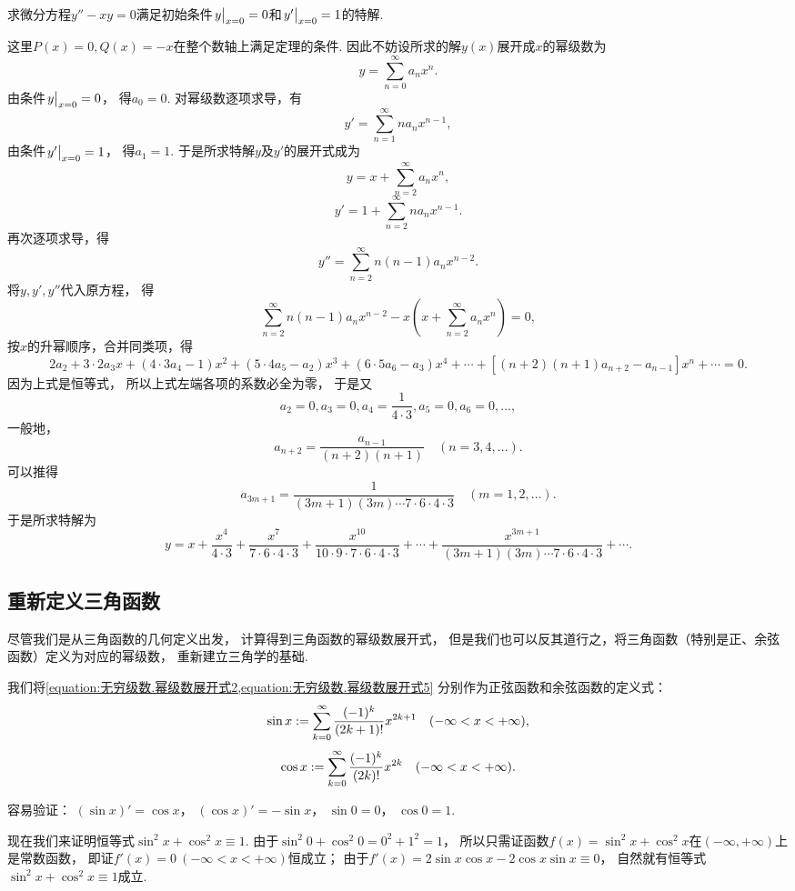 \begin{example}
求微分方程\(y''-xy=0\)满足初始条件\(\eval{y}_{x=0}=0\)和\(\eval{y'}_{x=0}=1\)的特解.
\begin{solution}
这里\(P(x)=0, Q(x)=-x\)在整个数轴上满足定理的条件.
因此不妨设所求的解\(y(x)\)展开成\(x\)的幂级数为\[
	y = \sum_{n=0}^\infty a_n x^n.
\]
由条件\(\eval{y}_{x=0}=0\)，
得\(a_0=0\).
对幂级数逐项求导，有\[
	y' = \sum_{n=1}^\infty n a_n x^{n-1},
\]
由条件\(\eval{y'}_{x=0}=1\)，
得\(a_1=1\).
于是所求特解\(y\)及\(y'\)的展开式成为\[
	y = x + \sum_{n=2}^\infty a_n x^n,
\]\[
	y' = 1 + \sum_{n=2}^\infty n a_n x^{n-1}.
\]
再次逐项求导，得\[
	y'' = \sum_{n=2}^\infty n(n-1) a_n x^{n-2}.
\]
将\(y,y',y''\)代入原方程，
得\[
	\sum_{n=2}^\infty n(n-1) a_n x^{n-2}
	- x \left( x + \sum_{n=2}^\infty a_n x^n \right)
	= 0,
\]
按\(x\)的升幂顺序，合并同类项，得\[
	2 a_2 + 3\cdot2 a_3 x + (4\cdot3 a_4 - 1) x^2
	+ (5\cdot4 a_5 - a_2) x^3 + (6\cdot5 a_6 - a_3) x^4
	+ \dotsb + [(n+2)(n+1) a_{n+2} - a_{n-1}] x^n + \dotsb
	= 0.
\]
因为上式是恒等式，
所以上式左端各项的系数必全为零，
于是又\[
	a_2 = 0,
	a_3 = 0,
	a_4 = \frac{1}{4\cdot3},
	a_5 = 0,
	a_6 = 0,
	\dotsc,
\]
一般地，\[
	a_{n+2} = \frac{a_{n-1}}{(n+2)(n+1)}
	\quad(n=3,4,\dotsc).
\]
可以推得\[
	a_{3m+1} = \frac{1}{(3m+1)(3m) \dotsm 7\cdot6\cdot4\cdot3}
	\quad(m=1,2,\dotsc).
\]
于是所求特解为\[
	y = x + \frac{x^4}{4\cdot3} + \frac{x^7}{7\cdot6\cdot4\cdot3}
	+ \frac{x^{10}}{10\cdot9\cdot7\cdot6\cdot4\cdot3}
	+ \dotsb
	+ \frac{x^{3m+1}}{(3m+1)(3m) \dotsm 7\cdot6\cdot4\cdot3}
	+ \dotsb.
\]
\end{solution}
\end{example}

\subsection{重新定义三角函数}
尽管我们是从三角函数的几何定义出发，
计算得到三角函数的幂级数展开式，
但是我们也可以反其道行之，将三角函数（特别是正、余弦函数）定义为对应的幂级数，
重新建立三角学的基础.

我们将\cref{equation:无穷级数.幂级数展开式2,equation:无穷级数.幂级数展开式5}
分别作为正弦函数和余弦函数的定义式：
\[
	\sin x := \sum_{k=0}^\infty \frac{(-1)^k}{(2k+1)!} x^{2k+1}
	\quad(-\infty<x<+\infty),
\]\[
	\cos x := \sum_{k=0}^\infty \frac{(-1)^k}{(2k)!} x^{2k}
	\quad(-\infty<x<+\infty).
\]

容易验证：
\((\sin x)' = \cos x\)，
\((\cos x)' = - \sin x\)，
\(\sin 0 = 0\)，
\(\cos 0 = 1\).

现在我们来证明恒等式\(\sin^2 x + \cos^2 x \equiv 1\).
由于\(\sin^2 0 + \cos^2 0 = 0^2 + 1^2 = 1\)，
所以只需证函数\(f(x) = \sin^2 x + \cos^2 x\)在\((-\infty,+\infty)\)上是常数函数，
即证\(f'(x) = 0\ (-\infty<x<+\infty)\)恒成立；
由于\(f'(x) = 2 \sin x \cos x - 2 \cos x \sin x \equiv 0\)，
自然就有恒等式\(\sin^2 x + \cos^2 x \equiv 1\)成立.

